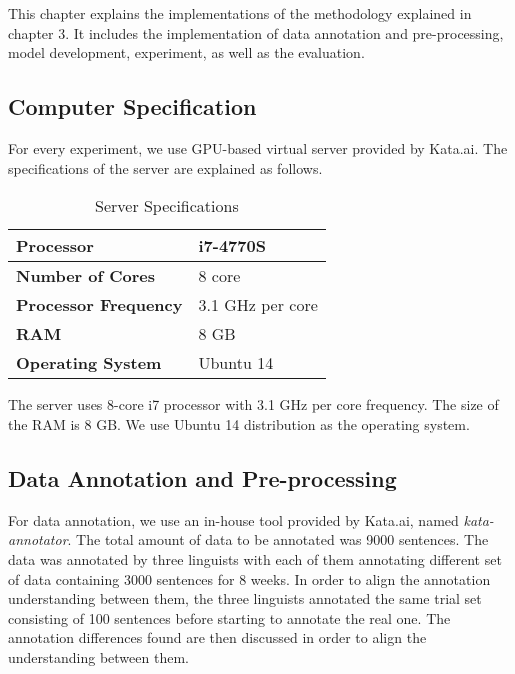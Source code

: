 \chapter{\babEmpat} \label{eksperimen}

This chapter explains the implementations of the methodology explained in chapter 3. It includes the implementation of data annotation and pre-processing, model development, experiment, as well as the evaluation.

\section{Computer Specification}
For every experiment, we use GPU-based virtual server provided by Kata.ai. The specifications of the server are explained as follows.

\begin{table}
	\centering
	\caption{Server Specifications}
	\begin{tabular}{|l|l|}
		\hline
		\textbf{Processor} & i7-4770S \\ \hline
		\textbf{Number of Cores} & 8 core \\ \hline
		\textbf{Processor Frequency} & 3.1 GHz per core \\ \hline
		\textbf{RAM} & 8 GB \\ \hline
		\textbf{Operating System} & Ubuntu 14 \\ \hline
	\end{tabular}
	\label{table:spesifikasi hardware}
\end{table}

The server uses 8-core i7 processor with 3.1 GHz per core frequency. The size of the RAM is 8 GB. We use Ubuntu 14 distribution as the operating system.

\section{Data Annotation and Pre-processing}
For data annotation, we use an in-house tool provided by Kata.ai, named \textit{kata-annotator}. The total amount of data to be annotated was 9000 sentences. The data was annotated by three linguists with each of them annotating different set of data containing 3000 sentences for 8 weeks. In order to align the annotation understanding between them, the three linguists annotated the same trial set consisting of 100 sentences before starting to annotate the real one. The annotation differences found are then discussed in order to align the understanding between them.

